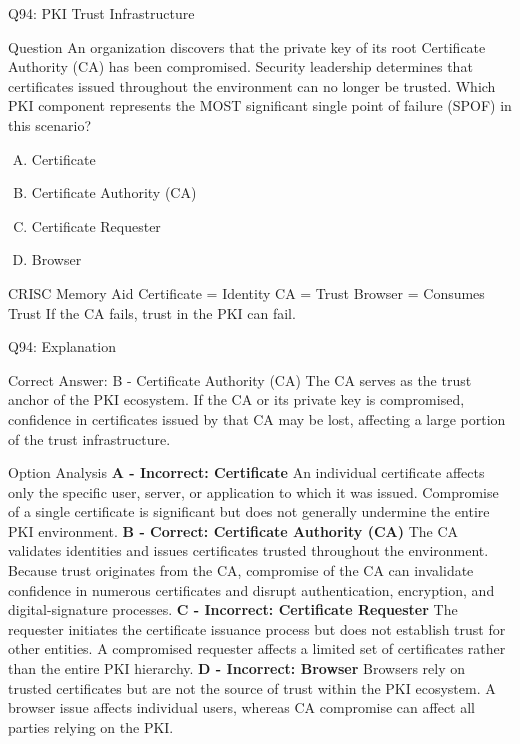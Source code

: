 \documentclass{beamer}
\begin{document}
	
	\begin{frame}{Q94: PKI Trust Infrastructure} \begin{block}{Question} An organization discovers that the private key of its root Certificate Authority (CA) has been compromised. Security leadership determines that certificates issued throughout the environment can no longer be trusted. Which PKI component represents the MOST significant single point of failure (SPOF) in this scenario? \end{block} \begin{enumerate}[(A)] \item Certificate \item Certificate Authority (CA) \item Certificate Requester \item Browser \end{enumerate} \begin{block}{CRISC Memory Aid} Certificate = Identity CA = Trust Browser = Consumes Trust If the CA fails, trust in the PKI can fail. \end{block}  \end{frame} \begin{frame}[shrink=10]{Q94: Explanation} \footnotesize \begin{block}{Correct Answer: B - Certificate Authority (CA)} The CA serves as the trust anchor of the PKI ecosystem. If the CA or its private key is compromised, confidence in certificates issued by that CA may be lost, affecting a large portion of the trust infrastructure. \end{block} \begin{block}{Option Analysis} \textbf{A - Incorrect: Certificate} An individual certificate affects only the specific user, server, or application to which it was issued. Compromise of a single certificate is significant but does not generally undermine the entire PKI environment. \vspace{0.15cm} \textbf{B - Correct: Certificate Authority (CA)} The CA validates identities and issues certificates trusted throughout the environment. Because trust originates from the CA, compromise of the CA can invalidate confidence in numerous certificates and disrupt authentication, encryption, and digital-signature processes. \vspace{0.15cm} \textbf{C - Incorrect: Certificate Requester} The requester initiates the certificate issuance process but does not establish trust for other entities. A compromised requester affects a limited set of certificates rather than the entire PKI hierarchy. \vspace{0.15cm} \textbf{D - Incorrect: Browser} Browsers rely on trusted certificates but are not the source of trust within the PKI ecosystem. A browser issue affects individual users, whereas CA compromise can affect all parties relying on the PKI. \end{block} \end{frame}
	
\end{document}
